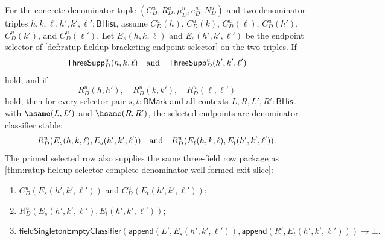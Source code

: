 \begin{theorem}
\label{thm:ratup-fieldup-selector-complete-row-stability}
For the concrete denominator tuple $(C_D^u,R_D^u,\mu_D^u,e_D^u,N_D^u)$ and two
denominator triples $h,k,\ell,h',k',\ell':\mathsf{BHist}$, assume
$C_D^u(h)$, $C_D^u(k)$, $C_D^u(\ell)$, $C_D^u(h')$, $C_D^u(k')$, and
$C_D^u(\ell')$. Let $E_s(h,k,\ell)$ and $E_s(h',k',\ell')$ be the endpoint
selector of \autoref{def:ratup-fieldup-bracketing-endpoint-selector} on the
two triples. If
$$
\mathsf{ThreeSupp}_D^u(h,k,\ell)
\quad\hbox{and}\quad
\mathsf{ThreeSupp}_D^u(h',k',\ell')
$$
hold, and if
$$
R_D^u(h,h'),\quad R_D^u(k,k'),\quad R_D^u(\ell,\ell')
$$
hold, then for every selector pair $s,t:\mathsf{BMark}$ and all contexts
$L,R,L',R':\mathsf{BHist}$ with $\hsame(L,L')$ and $\hsame(R,R')$, the
selected endpoints are denominator-classifier stable:
$$
R_D^u(E_s(h,k,\ell),E_s(h',k',\ell'))
\quad\hbox{and}\quad
R_D^u(E_t(h,k,\ell),E_t(h',k',\ell')).
$$
The primed selected row also supplies the same three-field row package as
\autoref{thm:ratup-fieldup-selector-complete-denominator-well-formed-exit-slice}:
\begin{enumerate}
  \item $C_D^u(E_s(h',k',\ell'))$ and $C_D^u(E_t(h',k',\ell'))$;
  \item $R_D^u(E_s(h',k',\ell'),E_t(h',k',\ell'))$;
  \item
  $$
  \mathsf{fieldSingletonEmptyClassifier}
  (\mathsf{append}(L',E_s(h',k',\ell')),
   \mathsf{append}(R',E_t(h',k',\ell')))\to\bot.
  $$
\end{enumerate}
\end{theorem}
